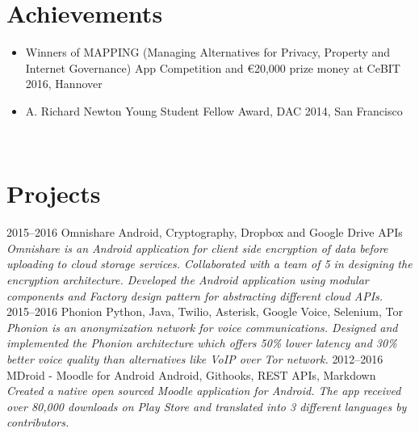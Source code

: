 \documentclass[]{friggeri-cv}
\begin{document}
\section{Achievements}
\begin{itemize}
  \item Winners of MAPPING (Managing Alternatives for Privacy, Property and Internet Governance) App Competition and \euro 20,000 prize money at CeBIT 2016, Hannover
  \item A. Richard Newton Young Student Fellow Award, DAC 2014, San Francisco
\end{itemize}
~

\section{Projects}
\begin{entrylist}
  \entry
    {2015–2016}
    {Omnishare}
    {Android, Cryptography, Dropbox and Google Drive APIs}
    {\emph{Omnishare is an Android application for client side encryption of data before uploading to cloud storage services. Collaborated with a team of 5 in designing the encryption architecture. Developed the Android application using modular components and Factory design pattern for abstracting different cloud APIs.}}
  \entry
    {2015–2016}
    {Phonion}
    {Python, Java, Twilio, Asterisk, Google Voice, Selenium, Tor}
    {\emph{Phonion is an anonymization network for voice communications. Designed and implemented the Phonion architecture which offers 50\% lower latency and 30\% better voice quality than alternatives like VoIP over Tor network.}}
  \entry
    {2012–2016}
    {MDroid - Moodle for Android}
    {Android, Githooks, REST APIs, Markdown}
    {\emph{Created a native open sourced Moodle application for Android. The app received over 80,000 downloads on Play Store and translated into 3 different languages by contributors.}}
\end{entrylist}
\end{document}
